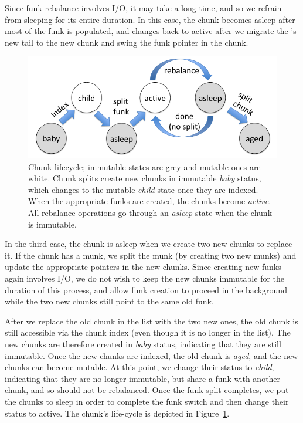 Since funk rebalance involves I/O, it may take a long time, and so we  refrain from sleeping for its entire 
duration. In this case, the chunk becomes asleep after most of the funk is populated, and 
changes back to active after we 
migrate the 's new tail to the new chunk and swing the funk pointer in the chunk.


\begin{figure}[htb]
\centerline{
\includegraphics[width=\columnwidth]{state-diagram.png}
}
\caption{Chunk lifecycle; immutable states are grey and mutable ones are white.
Chunk splits  create new chunks in immutable \emph{baby} status, which changes to the mutable \emph{child} state once they 
are indexed. When the appropriate funks are created, the chunks become \emph{active}. All rebalance operations go through an 
\emph{asleep} state when the chunk is immutable.}
\label{fig:status}
\end{figure}

In the third case, the chunk is asleep when we create two new chunks to replace it. 
If the chunk has a munk, we split the munk (by creating two new munks) and update the appropriate pointers in the new chunks.  
Since creating new funks again involves I/O, we do not wish to keep the new chunks immutable for the duration of this process,
and allow funk creation to proceed in the background while the two new chunks still point to the same old funk. 

After we replace the old chunk in the list with the two new ones, 
the old chunk is still accessible via the chunk index (even though it is no longer in the list). 
The new chunks are therefore created in \emph{baby} status, indicating that they are still immutable. 
Once the new chunks are indexed, the old chunk is \emph{aged}, and the new chunks can become mutable.
At this point, we change their status to \emph{child}, indicating that they are no longer immutable, but share a funk with another chunk,
and so should not be rebalanced. Once the funk split completes, we put the chunks to sleep in order
to complete the funk switch and then change their  status  to active. 
The chunk's life-cycle is depicted in Figure~\ref{fig:status}.

